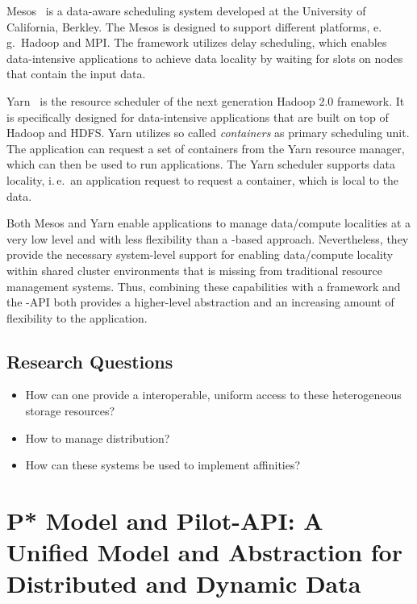 \documentclass{sig-alternate}
\begin{document}
Mesos~\cite{Hindman:2011:MPF:1972457.1972488} is a data-aware scheduling
system developed at the University of California, Berkley. The Mesos is
designed to support different platforms, e.\,g.\ Hadoop and MPI. The framework
utilizes delay scheduling, which enables data-intensive applications to
achieve data locality by waiting for slots on nodes that contain the input
data.

Yarn~\cite{yarn} is the resource scheduler of the next generation Hadoop 2.0
framework. It is specifically designed for data-intensive applications that
are built on top of Hadoop and HDFS. Yarn utilizes so called \emph{containers}
as primary scheduling unit. The application can request a set of containers
from the Yarn resource manager, which can then be used to run applications.
The Yarn scheduler supports data locality, i.\,e.\ an application request to
request a container, which is local to the data. 

Both Mesos and Yarn enable applications to manage data/compute localities at a
very low level and with less flexibility than a \pilot-based approach.
Nevertheless, they provide the necessary system-level support for enabling
data/compute locality within shared cluster environments that is missing from
traditional resource management systems. Thus, combining these capabilities 
with a \pilot framework and the \pilot-API both provides a higher-level 
abstraction and an increasing amount of flexibility to the application.



\subsection{Research Questions}
\begin{itemize}
	\item How can one provide a interoperable, uniform access to these heterogeneous storage resources?
	\item How to manage distribution?
	\item How can these systems be used to implement affinities?
\end{itemize}




\section{P* Model and Pilot-API: A Unified Model and Abstraction for 
Distributed and Dynamic Data}
\end{document}
